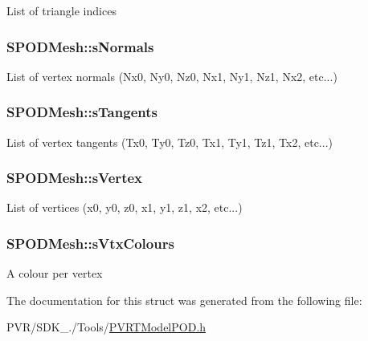 List of triangle indices \hypertarget{struct_s_p_o_d_mesh_a7bc4712a8f7eff22a95db2fb72e24be4}{
\subsubsection[{s\+Normals}]{ S\+P\+O\+D\+Mesh\+::s\+Normals}}\label{struct_s_p_o_d_mesh_a7bc4712a8f7eff22a95db2fb72e24be4}
List of vertex normals (Nx0, Ny0, Nz0, Nx1, Ny1, Nz1, Nx2, etc...) \hypertarget{struct_s_p_o_d_mesh_a411c2e02de81e618150d8004a77750c6}{
\subsubsection[{s\+Tangents}]{ S\+P\+O\+D\+Mesh\+::s\+Tangents}}\label{struct_s_p_o_d_mesh_a411c2e02de81e618150d8004a77750c6}
List of vertex tangents (Tx0, Ty0, Tz0, Tx1, Ty1, Tz1, Tx2, etc...) \hypertarget{struct_s_p_o_d_mesh_a5dcbfddeae128f6d937e5b82418f8438}{
\subsubsection[{s\+Vertex}]{ S\+P\+O\+D\+Mesh\+::s\+Vertex}}\label{struct_s_p_o_d_mesh_a5dcbfddeae128f6d937e5b82418f8438}
List of vertices (x0, y0, z0, x1, y1, z1, x2, etc...) \hypertarget{struct_s_p_o_d_mesh_a5b7862953fc6fb42758f69589488feaa}{
\subsubsection[{s\+Vtx\+Colours}]{ S\+P\+O\+D\+Mesh\+::s\+Vtx\+Colours}}\label{struct_s_p_o_d_mesh_a5b7862953fc6fb42758f69589488feaa}
A colour per vertex 

The documentation for this struct was generated from the following file\+:\begin{DoxyCompactItemize}
\item 
P\+V\+R/\+S\+D\+K\+\_./\+Tools/\hyperlink{_p_v_r_t_model_p_o_d_8h}{P\+V\+R\+T\+Model\+P\+O\+D.\+h}\end{DoxyCompactItemize}
